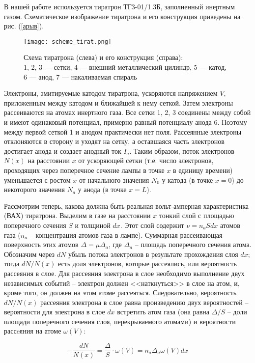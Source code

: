 В нашей работе используется тиратрон ТГ3-01/1.3Б, заполненный инертным газом.
Схематическое изображение тиратрона и его конструкция приведены на рис.
(\ref{арыв}).
\begin{wrapfigure}{r}{0.4\textwidth}
  \centering
  \texttt{[image: scheme\_tirat.png]}
  \caption{{Схема тиратрона (слева) и его конструкция (справа): 
  \\
  1, 2, 3 --- сетки, 4 --- внешний металлический цилиндр, 5 --- катод, \\ 6 ---
  анод, 7 --- накаливаемая спираль}}
  \label{img::sch_tirat}
\end{wrapfigure}
Электроны, эмитируемые катодом тиратрона, ускоряются напряжением $V$,
приложенным между катодом и ближайшей к нему сеткой. Затем электроны
рассеиваются на атомах инертного газа. Все сетки 1, 2, 3 соединены между собой и
имеют одинаковый потенциал, примерно равный потенциалу анода 6. Поэтому между
первой сеткой 1 и анодом практически нет поля. Рассеянные электроны отклоняются
в сторону и уходят на сетку, а оставшаяся часть электронов достигает анода и
создает анодный ток $I_a$. Таким образом, поток электронов $N(x)$ на расстоянии
$x$ от ускоряющей сетки (т.е. число электронов, проходящих через поперечное
сечение лампы в точке $x$ в единицу времени) уменьшается с ростом $x$ от
начального значения $N_0$ у катода (в точке $x = 0$) до некоторого значения
$N_a$ у анода (в точке $x = L$).

Рассмотрим теперь, какова должна быть реальная вольт-амперная характеристика
(ВАХ) тиратрона. Выделим в газе на расстоянии $x$ тонкий слой с площадью
поперечного сечения $S$ и толщиной $dx$. Этот слой содержит $\nu = n_a S dx$
атомов газа ($n_a$ -- концентрация атомов газа в лампе). Суммарная рассеивающая
поверхность этих атомов $\Delta = \mu \Delta_a$, где $\Delta_a$ -- площадь
поперечного сечения атома. Обозначим через $dN$ убыль потока электронов в
результате прохождения слоя $dx$; тогда $dN/N(x)$ есть доля электронов, которые
рассеялись, или вероятность рассеяния в слое. Для рассеяния электрона в слое
необходимо выполнение двух независимых событий -- электрон должен <<наткнуться>>
в слое на атом, и, кроме того, он должен на этом атоме рассеяться.
Следовательно, вероятность $dN/N(x)$ рассеяния электрона в слое равна
произведению двух вероятностей -- вероятности для электрона в слое $dx$
встретить атом газа (она равна $\Delta / S$ -- доли площади поперечного сечения
слоя, перекрываемого атомами) и вероятности рассeяния на атоме $\omega(V)$:

\begin{equation}
  - \frac{dN}{N(x)} = \frac{\Delta}{S} \cdot \omega(V) = n_a \Delta_a \omega(V) dx
\end{equation}

